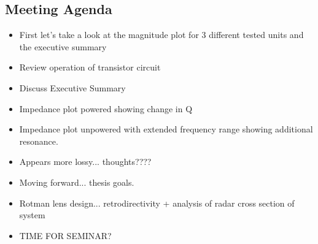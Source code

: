 \documentclass{article}                                                         %
\begin{document}
\begin{appendices}
\section{Meeting Agenda}
\begin{itemize}
  \item First let's take a look at the magnitude plot for 3 different tested units and the executive summary
  \item Review operation of transistor circuit
  \item Discuss Executive Summary
  \item Impedance plot powered showing change in Q
  \item Impedance plot unpowered with extended frequency range showing additional resonance.
  \item Appears more lossy... thoughts????

  \item Moving forward... thesis goals.
  \item Rotman lens design... retrodirectivity + analysis of radar cross section of system

  \item TIME FOR SEMINAR?
\end{itemize}

\end{appendices}
\end{document}
